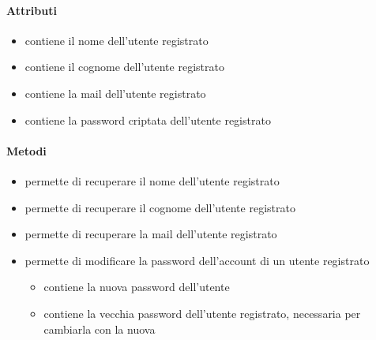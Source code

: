\paragraph{Attributi}
\begin{itemize}
\item {}
\newline
contiene il nome dell'utente registrato
\item {}
\newline
contiene il cognome dell'utente registrato
\item {}
\newline
contiene la mail dell'utente registrato
\item {}
\newline
contiene la password criptata dell'utente registrato
\end{itemize}
\paragraph{Metodi}
\begin{itemize}
\item {}
\newline
permette di recuperare il nome dell'utente registrato
\newline
\item {}
\newline
permette di recuperare il cognome dell'utente registrato
\newline
\item {}
\newline
permette di recuperare la mail dell'utente registrato
\newline
\item {}
\newline
permette di modificare la password dell'account di un utente registrato
\newline
{}
\newline
\begin{itemize}
\item {}
\newline
contiene la nuova password dell'utente
\item {}
\newline
contiene la vecchia password dell'utente registrato, necessaria per cambiarla con la nuova
\end{itemize}
\end{itemize}

